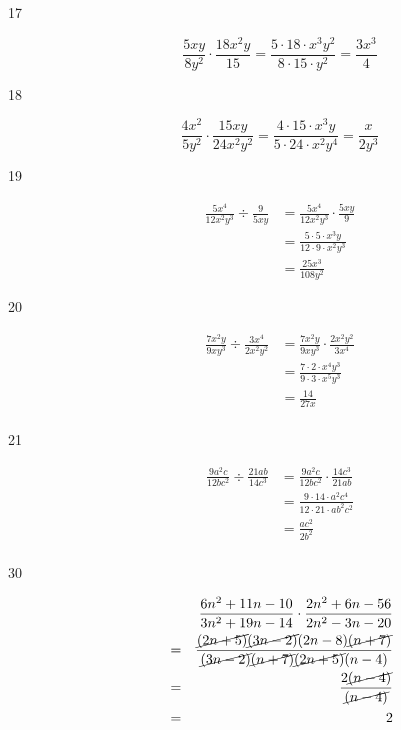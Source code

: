 \documentclass[fleqn,addpoints]{exam}
\begin{document}
\begin{description}

\item[17]
\[ \frac{5xy}{8y^2} \cdot \frac{18x^2y}{15} 
= \frac{5 \cdot 18 \cdot x^3y^2}{ 8 \cdot 15 \cdot y^2} = \frac{3x^3}{4} \]

\item[18]
\[ \frac{4x^2}{5y^2} \cdot \frac{15xy}{24x^2y^2} = \frac{4 \cdot 15 \cdot x^3y}{5 \cdot 24 \cdot x^2y^4} = \frac{x}{2y^3} \]

\item[19]
\begin{align*}
  \frac{5x^4}{12x^2y^3} \div \frac{9}{5xy} &= \frac{5x^4}{12x^2y^3} \cdot \frac{5xy}{9} \\
  &= \frac{5 \cdot 5 \cdot x^3y}{12 \cdot 9 \cdot x^2y^3} \\
  &= \frac{25x^3}{108y^2}
\end{align*}

\item[20]
\begin{align*}
  \frac{7x^2y}{9xy^3} \div \frac{3x^4}{2x^2y^2} &= \frac{7x^2y}{9xy^3} \cdot \frac{2x^2y^2}{3x^4} \\
  &= \frac{7 \cdot 2 \cdot x^4y^3}{9 \cdot 3 \cdot x^5y^3} \\
  &= \frac{14}{27x} \\
\end{align*}

\item[21]
\begin{align*}
  \frac{9a^2c}{12bc^2} \div \frac{21ab}{14c^3} &= \frac{9a^2c}{12bc^2} \cdot \frac{14c^3}{21ab} \\
  &= \frac{9 \cdot 14 \cdot a^2c^4}{12 \cdot 21 \cdot ab^2c^2} \\
  &= \frac{ac^2}{2b^2} \\
\end{align*}

\item[30]
\begin{eqnarray*}
  &   & \frac{6n^2 + 11n - 10}{3n^2 + 19n - 14} \cdot \frac{2n^2 + 6n - 56}{2n^2 - 3n - 20} \\ 
  & = & \frac{ \cancel{(2n + 5)} \cancel{(3n - 2)} (2n - 8) \cancel{(n + 7)} } {\cancel{(3n - 2)} \cancel{(n + 7)} \cancel{(2n + 5)} (n - 4) } \\
  & = & \frac{2 \cancel{(n - 4)}}{ \cancel{(n - 4)} } \\
  & = & 2 \\  
\end{eqnarray*}


\end{description}
\end{document}
